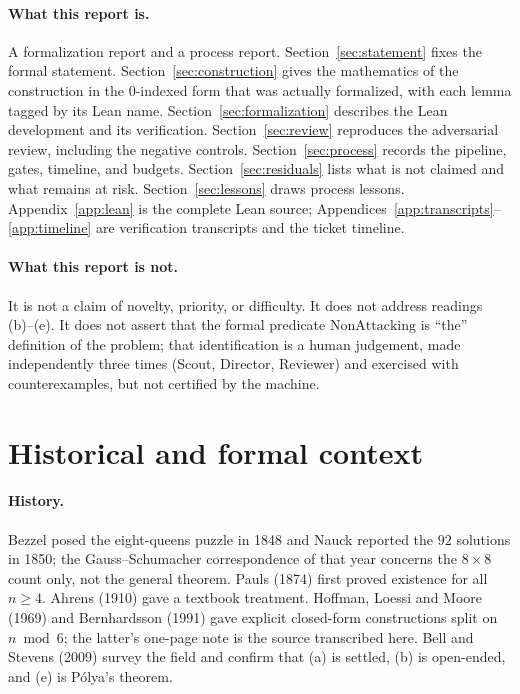\documentclass[11pt,a4paper]{article}
\theoremstyle{definition}
\theoremstyle{remark}
\newcommand{\NonAttacking}{\mathrm{NonAttacking}}
\begin{document}
\paragraph{What this report is.}
A formalization report and a process report. Section~\ref{sec:statement} fixes the formal
statement. Section~\ref{sec:construction} gives the mathematics of the construction in the
0-indexed form that was actually formalized, with each lemma tagged by its Lean name.
Section~\ref{sec:formalization} describes the Lean development and its verification.
Section~\ref{sec:review} reproduces the adversarial review, including the negative
controls. Section~\ref{sec:process} records the pipeline, gates, timeline, and budgets.
Section~\ref{sec:residuals} lists what is not claimed and what remains at risk.
Section~\ref{sec:lessons} draws process lessons. Appendix~\ref{app:lean} is the complete
Lean source; Appendices~\ref{app:transcripts}--\ref{app:timeline} are verification
transcripts and the ticket timeline.

\paragraph{What this report is not.}
It is not a claim of novelty, priority, or difficulty. It does not address readings
(b)--(e). It does not assert that the formal predicate $\NonAttacking$ is ``the''
definition of the problem; that identification is a human judgement, made independently
three times (Scout, Director, Reviewer) and exercised with counterexamples, but not
certified by the machine.

\section{Historical and formal context}
\label{sec:context}

\paragraph{History.}
Bezzel posed the eight-queens puzzle in 1848 and Nauck reported the $92$ solutions in
1850; the Gauss--Schumacher correspondence of that year concerns the $8\times 8$ count
only, not the general theorem. Pauls (1874) first proved existence for all $n\ge 4$.
Ahrens (1910) gave a textbook treatment. Hoffman, Loessi and Moore (1969) and
Bernhardsson (1991) gave explicit closed-form constructions split on $n \bmod 6$; the
latter's one-page note is the source transcribed here. Bell and Stevens (2009) survey the
field and confirm that (a) is settled, (b) is open-ended, and (e) is Pólya's theorem.
\end{document}
